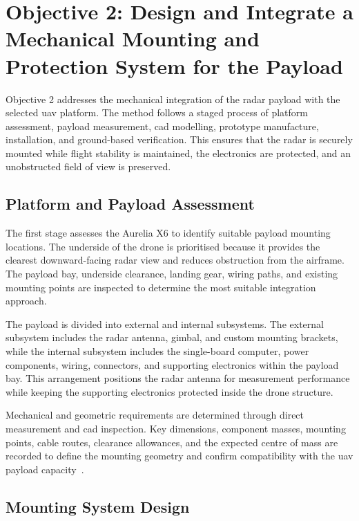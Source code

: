 \section{Objective 2: Design and Integrate a Mechanical Mounting and Protection System for the Payload}

Objective 2 addresses the mechanical integration of the radar payload with the selected \gls{uav} platform. The method follows a staged process of platform assessment, payload measurement, \gls{cad} modelling, prototype manufacture, installation, and ground-based verification. This ensures that the radar is securely mounted while flight stability is maintained, the electronics are protected, and an unobstructed field of view is preserved.

\subsection{Platform and Payload Assessment}

The first stage assesses the Aurelia X6 to identify suitable payload mounting locations. The underside of the drone is prioritised because it provides the clearest downward-facing radar view and reduces obstruction from the airframe. The payload bay, underside clearance, landing gear, wiring paths, and existing mounting points are inspected to determine the most suitable integration approach.

The payload is divided into external and internal subsystems. The external subsystem includes the radar antenna, gimbal, and custom mounting brackets, while the internal subsystem includes the single-board computer, power components, wiring, connectors, and supporting electronics within the payload bay. This arrangement positions the radar antenna for measurement performance while keeping the supporting electronics protected inside the drone structure.

Mechanical and geometric requirements are determined through direct measurement and \gls{cad} inspection. Key dimensions, component masses, mounting points, cable routes, clearance allowances, and the expected centre of mass are recorded to define the mounting geometry and confirm compatibility with the \gls{uav} payload capacity~\cite{aurelia2025x6}.

\subsection{Mounting System Design}


